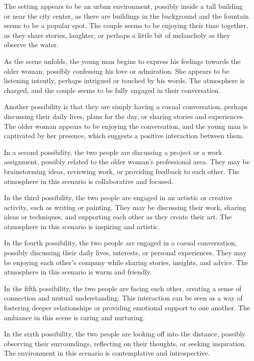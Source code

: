 \documentclass[smalldemyvopaper,11pt,twoside,onecolumn,openright,extrafontsizes]{memoir}
\begin{document}
The setting appears to be an urban environment, possibly inside a tall building or near the city center, as there are buildings in the background and the fountain seems to be a popular spot. The couple seems to be enjoying their time together, as they share stories, laughter, or perhaps a little bit of melancholy as they observe the water.\par
As the scene unfolds, the young man begins to express his feelings towards the older woman, possibly confessing his love or admiration. She appears to be listening intently, perhaps intrigued or touched by his words. The atmosphere is charged, and the couple seems to be fully engaged in their conversation.\par
Another possibility is that they are simply having a casual conversation, perhaps discussing their daily lives, plans for the day, or sharing stories and experiences. The older woman appears to be enjoying the conversation, and the young man is captivated by her presence, which suggests a positive interaction between them.\par
In a second possibility, the two people are discussing a project or a work assignment, possibly related to the older woman's professional area. They may be brainstorming ideas, reviewing work, or providing feedback to each other. The atmosphere in this scenario is collaborative and focused.\par
In the third possibility, the two people are engaged in an artistic or creative activity, such as writing or painting. They may be discussing their work, sharing ideas or techniques, and supporting each other as they create their art. The atmosphere in this scenario is inspiring and artistic.\par
In the fourth possibility, the two people are engaged in a casual conversation, possibly discussing their daily lives, interests, or personal experiences. They may be enjoying each other's company while sharing stories, insights, and advice. The atmosphere in this scenario is warm and friendly.\par
In the fifth possibility, the two people are facing each other, creating a sense of connection and mutual understanding. This interaction can be seen as a way of fostering deeper relationships or providing emotional support to one another. The ambiance in this scene is caring and nurturing.\par
In the sixth possibility, the two people are looking off into the distance, possibly observing their surroundings, reflecting on their thoughts, or seeking inspiration. The environment in this scenario is contemplative and introspective.\par
\end{document}
